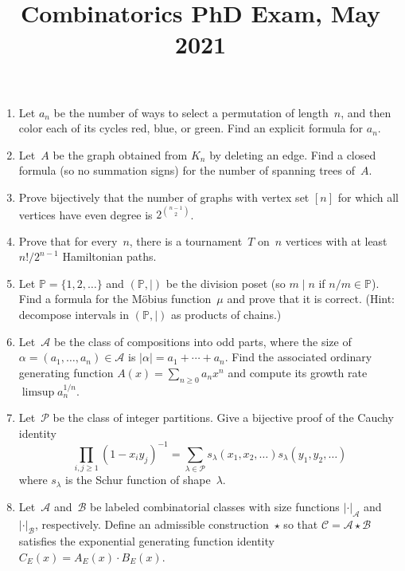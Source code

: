 \documentclass[11pt,letterpaper]{article}
\title{Combinatorics PhD Exam, May 2021}
\author{}
\date{}
\newenvironment{examproblems}[2]{%
  \def\ProblemHeadingTag{#2}%
  \AssignTaggingSocketPlug{block/list/label}{examproblem}%
  \begin{enumerate}%
  \setcounter{enumi}{#1}%
  \renewcommand{\labelenumi}{\textbf{\theenumi.}}%
  \setlength{\topsep}{0.35em}%
  \setlength{\partopsep}{0pt}%
  \setlength{\itemsep}{0.48em}%
  \setlength{\parsep}{0.18em}%
}{\end{enumerate}}
\begin{document}
\maketitle
\thispagestyle{empty}
\begin{examproblems}{0}{H2}
\def\ProblemHeadingText{Problem 1.}
\item
Let \(a_n\) be the number of ways to select a permutation of length~\(n\), and then color each of its cycles red, blue, or green. Find an explicit formula for \(a_n\).
\def\ProblemHeadingText{Problem 2.}
\item
Let~\(A\) be the graph obtained from \(K_n\) by deleting an edge. Find a closed formula (so no summation signs) for the number of spanning trees of~\(A\).
\def\ProblemHeadingText{Problem 3.}
\item
Prove bijectively that the number of graphs with vertex set \([n]\) for which all vertices have even degree is \(2^{\binom{n-1}{2}}\).
\def\ProblemHeadingText{Problem 4.}
\item
Prove that for every~\(n\), there is a tournament~\(T\) on~\(n\) vertices with at least \(n!/2^{n-1}\) Hamiltonian paths.
\def\ProblemHeadingText{Problem 5.}
\item
Let \(\mathbb{P}=\{1,2,\ldots\}\) and \((\mathbb{P},\mid)\) be the division poset (so \(m\mid n\) if \(n/m\in\mathbb{P}\)). Find a formula for the Möbius function~\(\mu\) and prove that it is correct. (Hint: decompose intervals in \((\mathbb{P},\mid)\) as products of chains.)
\def\ProblemHeadingText{Problem 6.}
\item
Let~\(\mathcal{A}\) be the class of compositions into odd parts, where the size of \(\alpha=(a_1,\ldots,a_n)\in\mathcal{A}\) is \(|\alpha|=a_1+\cdots+a_n\). Find the associated ordinary generating function \(A(x)=\sum_{n\geq 0}a_nx^n\) and compute its growth rate \(\limsup a_n^{1/n}\).
\def\ProblemHeadingText{Problem 7.}
\item
Let~\(\mathcal{P}\) be the class of integer partitions. Give a bijective proof of the Cauchy identity
\[
\prod_{i,j\geq 1}(1-x_i y_j)^{-1}=\sum_{\lambda\in\mathcal{P}}s_\lambda(x_1,x_2,\ldots)s_\lambda(y_1,y_2,\ldots)
\]
 where \(s_\lambda\) is the Schur function of shape~\(\lambda\).
\def\ProblemHeadingText{Problem 8.}
\item
Let~\(\mathcal{A}\) and~\(\mathcal{B}\) be labeled combinatorial classes with size functions \(|\cdot|_{\mathcal{A}}\) and \(|\cdot|_{\mathcal{B}}\), respectively. Define an admissible construction~\(\star\) so that \(\mathcal{C}=\mathcal{A}\star\mathcal{B}\) satisfies the exponential generating function identity \(C_E(x)=A_E(x)\cdot B_E(x)\).
\end{examproblems}
\end{document}
